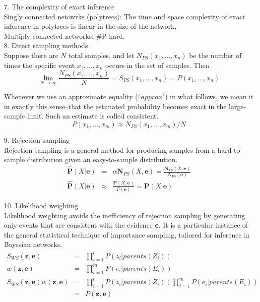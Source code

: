 \documentclass[12pt]{article}
\begin{document}
7. The complexity of exact inference \\

Singly connected netowrks (polytrees): The time and space complexity of exact inference in polytrees is linear in the size of the network. \\

Multiply connected networks: \#P-hard. \\

8. Direct sampling methods \\

Suppose there are $N$ total samples, and let $N_{PS}(x_1,...,x_n)$ be the number of times the specific event $x_1,...,x_n$ occurs in the set of samples. Then
\begin{equation*}
  \lim_{N\rightarrow \infty} \frac {N_{PS}(x_1,...,x_n)}{N}
  = S_{PS}(x_1,...,x_n) = P(x_1,...,x_n)
\end{equation*}

Whenever we use an approximate equality (``$approx$") in what follows, we mean it in exactly this sense--that the estimated probability becomes exact in the large-sample limit. Such an estimate is called consistent.
\begin{equation*}
  P(x_1,...,x_m) \approx N_{PS}(x_1,...,x_m)/N
\end{equation*}

9. Rejection sampling \\

Rejection sampling is a general method for producing samples from a hard-to-sample distribution given an easy-to-sample distribution.
\begin{eqnarray*}
  \hat{\boldsymbol{P}}(X|\boldsymbol{e})
  &=& \alpha \boldsymbol{N}_{PS}(X, \boldsymbol{e})
  = \frac {\boldsymbol{N}_{PS}(X, \boldsymbol{e})}
          {N_{PS}(\boldsymbol{e})} \\
  \hat{\boldsymbol{P}}(X|\boldsymbol{e})
  &\approx& \frac {\boldsymbol{P}(X, \boldsymbol{e})}
                  {P(\boldsymbol{e})}
  = \boldsymbol{P}(X | \boldsymbol{e})
\end{eqnarray*}

10. Likelihood weighting \\

Likelihood weighting avoids the inefficiency of rejection sampling by generating only events that are consistent with the evidence {\bf e}. It is a particular instance of the general statistical technique of importance sampling, tailored for inference in Bayesian networks.
\begin{eqnarray*}
S_{WS}(\boldsymbol{z}, \boldsymbol{e})
&=& \prod^l_{i=1} P(z_i | parents(Z_i)) \\
w(\boldsymbol{z}, \boldsymbol{e})
&=& \prod^m_{i=1} P(e_i | parents(E_i)) \\
S_{WS}(\boldsymbol{z}, \boldsymbol{e}) w(\boldsymbol{z}, \boldsymbol{e})
&=& \prod^l_{i=1} P(z_i | parents(Z_i)) \prod^m_{i=1} P(e_i | parents(E_i)) \\
&=& P(\boldsymbol{z}, \boldsymbol{e})
\end{eqnarray*}
\end{document}
